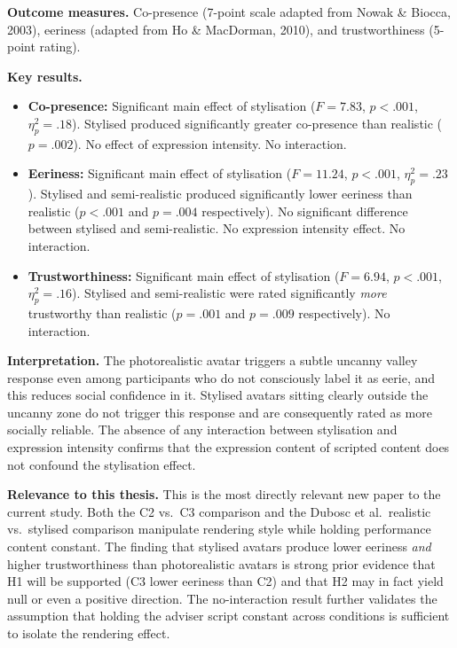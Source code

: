 \documentclass[11pt, a4paper]{article}
\begin{document}
\textbf{Outcome measures.} Co-presence (7-point scale adapted from Nowak \& Biocca, 2003), eeriness (adapted from Ho \& MacDorman, 2010), and trustworthiness (5-point rating).

\textbf{Key results.}
\begin{itemize}[leftmargin=2em]
  \item \textbf{Co-presence:} Significant main effect of stylisation ($F = 7.83$, $p < .001$, $\eta^2_p = .18$). Stylised produced significantly greater co-presence than realistic ($p = .002$). No effect of expression intensity. No interaction.
  \item \textbf{Eeriness:} Significant main effect of stylisation ($F = 11.24$, $p < .001$, $\eta^2_p = .23$). Stylised and semi-realistic produced significantly lower eeriness than realistic ($p < .001$ and $p = .004$ respectively). No significant difference between stylised and semi-realistic. No expression intensity effect. No interaction.
  \item \textbf{Trustworthiness:} Significant main effect of stylisation ($F = 6.94$, $p < .001$, $\eta^2_p = .16$). Stylised and semi-realistic were rated significantly \textit{more} trustworthy than realistic ($p = .001$ and $p = .009$ respectively). No interaction.
\end{itemize}

\textbf{Interpretation.} The photorealistic avatar triggers a subtle uncanny valley response even among participants who do not consciously label it as eerie, and this reduces social confidence in it. Stylised avatars sitting clearly outside the uncanny zone do not trigger this response and are consequently rated as more socially reliable. The absence of any interaction between stylisation and expression intensity confirms that the expression content of scripted content does not confound the stylisation effect.

\textbf{Relevance to this thesis.} This is the most directly relevant new paper to the current study. Both the C2 vs.\ C3 comparison and the Dubosc et al.\ realistic vs.\ stylised comparison manipulate rendering style while holding performance content constant. The finding that stylised avatars produce lower eeriness \textit{and} higher trustworthiness than photorealistic avatars is strong prior evidence that H1 will be supported (C3 lower eeriness than C2) and that H2 may in fact yield null or even a positive direction. The no-interaction result further validates the assumption that holding the adviser script constant across conditions is sufficient to isolate the rendering effect.
\end{document}
